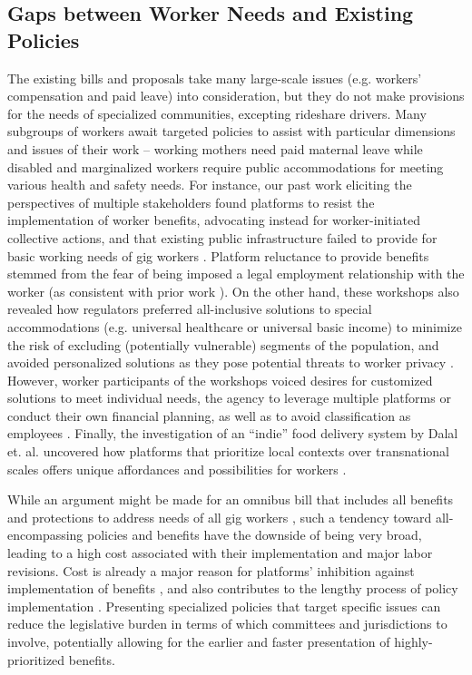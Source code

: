 \subsection{Gaps between Worker Needs and Existing Policies}
The existing bills and proposals take many large-scale issues (e.g. workers' compensation and paid leave) into consideration, but they do not make provisions for the needs of specialized communities, excepting rideshare drivers. Many subgroups of workers await targeted policies to assist with particular dimensions and issues of their work – working mothers need paid maternal leave while disabled and marginalized workers require public accommodations for meeting various health and safety needs. For instance, our past work eliciting the perspectives of multiple stakeholders found platforms to resist the implementation of worker benefits, advocating instead for worker-initiated collective actions, and that existing public infrastructure failed to provide for basic working needs of gig workers \cite{codesign}. Platform reluctance to provide benefits stemmed from the fear of being imposed a legal employment relationship with the worker (as consistent with prior work \cite{harris2015proposal}). On the other hand, these workshops also revealed how regulators preferred all-inclusive solutions to special accommodations (e.g. universal healthcare or universal basic income) to minimize the risk of excluding (potentially vulnerable) segments of the population, and avoided personalized solutions as they pose potential threats to worker privacy \cite{codesign}. However, worker participants of the workshops voiced desires for customized solutions to meet individual needs, the agency to leverage multiple platforms or conduct their own financial planning, as well as to avoid classification as employees \cite{codesign}. Finally, the investigation of an ``indie'' food delivery system by Dalal et. al. uncovered how platforms that prioritize local contexts over transnational scales offers unique affordances and possibilities for workers \cite{dalal2023understanding}.

While an argument might be made for an omnibus bill that includes all benefits and protections to address needs of all gig workers \cite{harris2015proposal}, such a tendency toward all-encompassing policies and benefits have the downside of being very broad, leading to a high cost associated with their implementation and major labor revisions. Cost is already a major reason for platforms' inhibition against implementation of benefits \cite{codesign}, and also contributes to the lengthy process of policy implementation \cite{Hudson2019-un}. Presenting specialized policies that target specific issues can reduce the legislative burden in terms of which committees and jurisdictions to involve, potentially allowing for the earlier and faster presentation of highly-prioritized benefits. 

